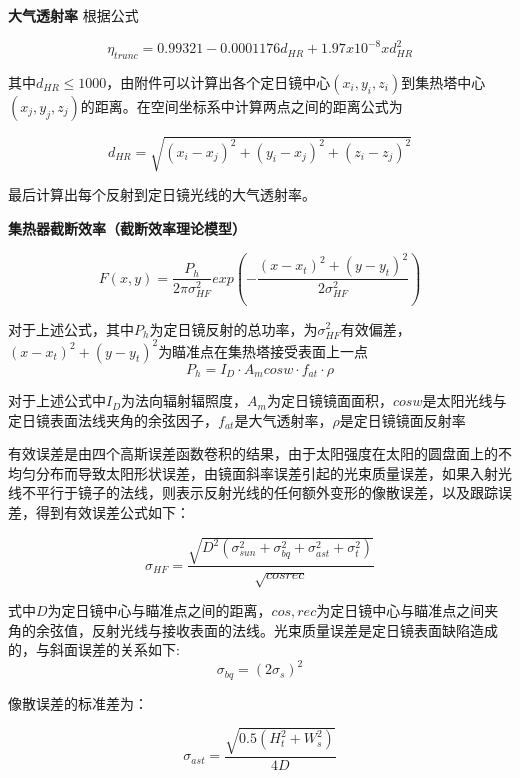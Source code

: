 \documentclass[withoutpreface,bwprint]{cumcmthesis} %
\begin{document}
\textbf{大气透射率} \space 根据公式

\begin{equation}
    \eta_{trunc}=0.99321-0.0001176d_{HR}+1.97x10^{-8}xd^{2}_{HR}
\end{equation}

其中$d_{HR}\leq 1000$，由附件可以计算出各个定日镜中心$(x_{i},y_{i},z_{i})$到集热塔中心$(x_{j},y_{j},z_{j})$的距离。在空间坐标系中计算两点之间的距离公式为

\begin{equation}
    d_{HR}=\sqrt{(x_{i}-x_{j})^2+(y_{i}-x_{j})^2+(z_{i}-z_{j})^2}
\end{equation}

最后计算出每个反射到定日镜光线的大气透射率。

\textbf{集热器截断效率（截断效率理论模型）}\space

\begin{equation}
    F(x,y)=\frac{P_{h}}{2\pi\sigma^2_{HF}}exp(-\frac{(x-x_{t})^2+(y-y_{t})^2}{2\sigma^2_{HF}})
\end{equation}

对于上述公式，其中$P_{h}$为定日镜反射的总功率，为$\sigma^2_{HF}$有效偏差，$(x-x_{t})^2+(y-y_{t})^2$为瞄准点在集热塔接受表面上一点$$P_{h}=I_{D}\cdot A_{m}cosw\cdot f_{at}\cdot \rho$$

对于上述公式中$I_{D}$为法向辐射辐照度，$A_{m}$为定日镜镜面面积，$cosw$是太阳光线与定日镜表面法线夹角的余弦因子，$f_{at}$是大气透射率，$\rho$是定日镜镜面反射率

有效误差是由四个高斯误差函数卷积的结果，由于太阳强度在太阳的圆盘面上的不均匀分布而导致太阳形状误差，由镜面斜率误差引起的光束质量误差，如果入射光线不平行于镜子的法线，则表示反射光线的任何额外变形的像散误差，以及跟踪误差，得到有效误差公式如下：

\begin{equation}
    \sigma_{HF}=\frac{\sqrt{D^{2}(\sigma^2_{sun}+\sigma^2_{bq}+\sigma^2_{ast}+\sigma^2_{t})}}{\sqrt{cos rec}}
\end{equation}

式中$D$为定日镜中心与瞄准点之间的距离，$cos,rec$为定日镜中心与瞄准点之间夹角的余弦值，反射光线与接收表面的法线。光束质量误差是定日镜表面缺陷造成的，与斜面误差的关系如下:
\begin{equation}
    \sigma_{bq}=(2\sigma_{s})^2
\end{equation}

像散误差的标准差为：

\begin{equation}
    \sigma_{ast}=\frac{\sqrt{0.5(H^2_{t}+W^2_{s})}}{4D}
\end{equation}
\end{document}
